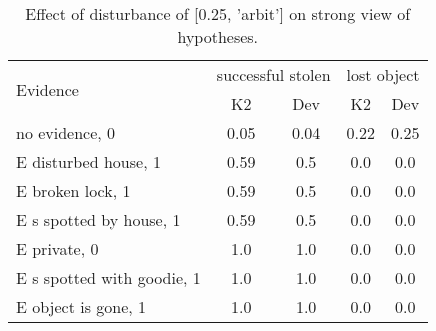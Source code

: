 \begin{table}\begin{tabular}{l|cc|cc}\toprule\multirow{2}{*}{Evidence} & \multicolumn{2}{c}{successful stolen}& \multicolumn{2}{c}{lost object}\\& {K2} & {Dev}& {K2} & {Dev}\\\midrule
no evidence, 0 & 0.05&0.04&0.22&0.25\\E disturbed house, 1 & \cellcolor{Bittersweet}0.59&\cellcolor{Bittersweet}0.5&0.0&0.0\\E broken lock, 1 & \cellcolor{Bittersweet}0.59&\cellcolor{Bittersweet}0.5&0.0&0.0\\E s spotted by house, 1 & \cellcolor{Bittersweet}0.59&\cellcolor{Bittersweet}0.5&0.0&0.0\\E private, 0 & 1.0&1.0&0.0&0.0\\E s spotted with goodie, 1 & 1.0&1.0&0.0&0.0\\E object is gone, 1 & 1.0&1.0&0.0&0.0\\\bottomrule\end{tabular}\caption{Effect of disturbance of [0.25, 'arbit'] on strong view of hypotheses.}\end{table}